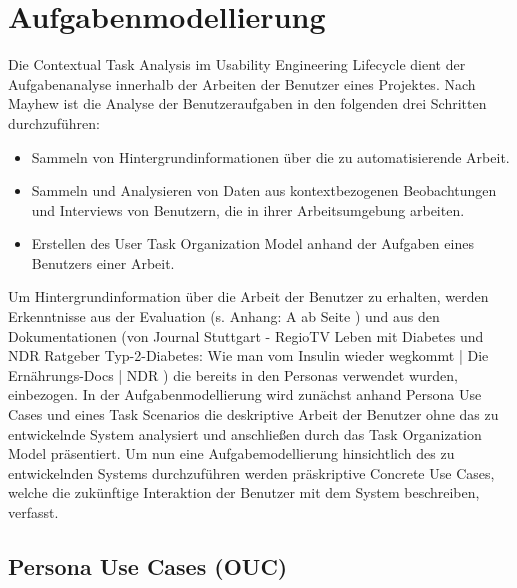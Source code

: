 \section{Aufgabenmodellierung}
Die Contextual Task Analysis im Usability Engineering Lifecycle dient der Aufgabenanalyse innerhalb der Arbeiten der Benutzer eines Projektes. Nach Mayhew \cite{MD} ist die Analyse der Benutzeraufgaben in den folgenden drei Schritten durchzuführen:
\begin{itemize}
	\item Sammeln von Hintergrundinformationen über die zu automatisierende Arbeit.
	\item Sammeln und Analysieren von Daten aus kontextbezogenen Beobachtungen und Interviews von Benutzern, die in ihrer Arbeitsumgebung arbeiten.
	\item Erstellen des \glqq User Task Organization Model\grqq{} anhand der Aufgaben eines Benutzers einer Arbeit.
\end{itemize}

Um Hintergrundinformation über die Arbeit der Benutzer zu erhalten, werden Erkenntnisse aus der Evaluation (s. Anhang: A  ab Seite \pageref{section:Evaluation}) und aus den Dokumentationen (von Journal Stuttgart - RegioTV \glqq Leben mit Diabetes\grqq{} \cite{JS} und NDR Ratgeber \glqq Typ-2-Diabetes: Wie man vom Insulin wieder wegkommt | Die Ernährungs-Docs | NDR\grqq{} \cite{DED}) die bereits in den Personas verwendet wurden, einbezogen.\newline
In der Aufgabenmodellierung wird zunächst anhand Persona Use Cases und eines Task Scenarios die deskriptive Arbeit der Benutzer ohne das zu entwickelnde System analysiert und anschließen durch das Task Organization Model präsentiert. Um nun eine Aufgabemodellierung hinsichtlich des zu entwickelnden Systems durchzuführen werden präskriptive Concrete Use Cases, welche die zukünftige Interaktion der Benutzer mit dem System beschreiben, verfasst. 

\subsection{Persona Use Cases (OUC)}

